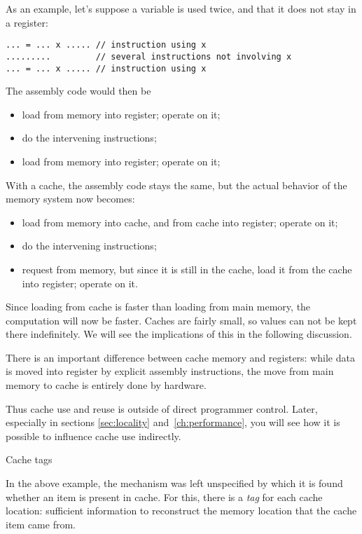 As an example, let's suppose a variable  is used twice,
and that it does not stay in a register:
\begin{lstlisting}
... = ... x ..... // instruction using x
.........         // several instructions not involving x
... = ... x ..... // instruction using x
\end{lstlisting}
The assembly code would then be
\begin{itemize}
\item load  from memory into register; operate on it;
\item do the intervening instructions;
\item load  from memory into register; operate on it;
\end{itemize}
With a cache, the assembly code stays the same, but the actual
behavior of the memory system now becomes:
\begin{itemize}
\item load  from memory into cache, and from cache into register;
  operate on it;
\item do the intervening instructions;
\item request  from memory, but since it is still in the cache,
  load it from the cache into register; operate on it.
\end{itemize}
Since loading from cache is faster than loading from main memory, the
computation will now be faster. Caches are fairly small, so values
can not be kept there indefinitely. We will see the implications of
this in the following discussion.

There is an important difference between cache memory and registers:
while data is moved into register by explicit assembly instructions,
the move from main memory to cache is entirely done by hardware.


Thus
cache use and reuse is outside of direct programmer control. Later,
especially in sections \ref{sec:locality}
and~\ref{ch:performance}, you will see how it is possible to
influence cache use indirectly.

 {Cache tags}
\label{sec:cache-tag}

In the above example, the mechanism was left unspecified by which it is found whether an
item is present in cache. For this, there is a
%
\emph{tag}
for each cache location: sufficient information to reconstruct the
memory location that the cache item came from.

